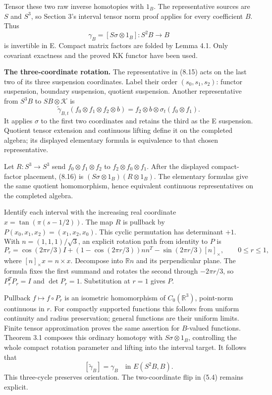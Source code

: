 \documentclass[
  11pt,
]{article}
\begin{document}
Tensor these two raw inverse homotopies with \(1_B\). The representative
sources are \(S\) and \(S^3\), so Section 3's interval tensor norm proof
applies for every coefficient \(B\). Thus \[
\gamma_B=[S\sigma\otimes1_B]:S^2B\longrightarrow B
\tag{8.15}
\] is invertible in E. Compact matrix factors are folded by Lemma 4.1.
Only covariant exactness and the proved KK functor have been used.

\textbf{The three-coordinate rotation.} The representative in (8.15)
acts on the last two of its three suspension coordinates. Label their
order \((s_0,s_1,s_2)\): functor suspension, boundary suspension,
quotient suspension. Another representative from \(S^3B\) to
\(SB\otimes\mathcal K\) is \[
\widetilde\gamma_{B,t}(f_0\otimes f_1\otimes f_2\otimes b)
=f_2\otimes b\otimes\sigma_t(f_0\otimes f_1).
\tag{8.16}
\] It applies \(\sigma\) to the first two coordinates and retains the
third as the E suspension. Quotient tensor extension and continuous
lifting define it on the completed algebra; its displayed elementary
formula is equivalence to that chosen representative.

Let \(R:S^3\to S^3\) send \(f_0\otimes f_1\otimes f_2\) to
\(f_2\otimes f_0\otimes f_1\). After the displayed compact-factor
placement, (8.16) is \((S\sigma\otimes1_B)(R\otimes1_B)\). The
elementary formulas give the same quotient homomorphism, hence
equivalent continuous representatives on the completed algebra.

Identify each interval with the increasing real coordinate
\(x=\tan(\pi(s-1/2))\). The map \(R\) is pullback by
\(P(x_0,x_1,x_2)=(x_1,x_2,x_0)\). This cyclic permutation has
determinant \(+1\). With \(n=(1,1,1)/\sqrt3\), an explicit rotation path
from identity to \(P\) is \[
P_r=\cos(2\pi r/3)I+
(1-\cos(2\pi r/3))nn^T-
\sin(2\pi r/3)[n]_\times,
\qquad0\leq r\leq1,
\tag{8.17}
\] where \([n]_\times x=n\times x\). Decompose into \(\mathbb Rn\) and
its perpendicular plane. The formula fixes the first summand and rotates
the second through \(-2\pi r/3\), so \(P_r^TP_r=I\) and \(\det P_r=1\).
Substitution at \(r=1\) gives \(P\).

Pullback \(f\mapsto f\circ P_r\) is an isometric homomorphism of
\(C_0(\mathbb R^3)\), point-norm continuous in \(r\). For compactly
supported functions this follows from uniform continuity and radius
preservation; general functions are their uniform limits. Finite tensor
approximation proves the same assertion for \(B\)-valued functions.
Theorem 3.1 composes this ordinary homotopy with \(S\sigma\otimes1_B\),
controlling the whole compact rotation parameter and lifting into the
interval target. It follows that \[
[\widetilde\gamma_B]=\gamma_B
\quad\text{in }E(S^2B,B).
\tag{8.18}
\] This three-cycle preserves orientation. The two-coordinate flip in
(5.4) remains explicit.
\end{document}
